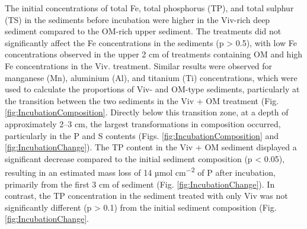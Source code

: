 \documentclass[12pt,twoside]{book}
\begin{document}
The initial concentrations of total Fe, total phosphorus (TP), and total sulphur (TS) in the sediments before incubation were higher in the Viv-rich deep sediment compared to the OM-rich upper sediment. The treatments did not significantly affect the Fe concentrations in the sediments (p \textgreater{} 0.5), with low Fe concentrations observed in the upper 2 cm of treatments containing OM and high Fe concentrations in the Viv. treatment. Similar results were observed for manganese (Mn), aluminium (Al), and titanium (Ti) concentrations, which were used to calculate the proportions of Viv- and OM-type sediments, particularly at the transition between the two sediments in the Viv + OM treatment (Fig. \ref{fig:IncubationComposition}. Directly below this transition zone, at a depth of approximately 2--3 cm, the largest transformations in composition occurred, particularly in the P and S contents (Figs. \ref{fig:IncubationComposition} and \ref{fig:IncubationChange}). The TP content in the Viv + OM sediment displayed a significant decrease compared to the initial sediment composition (p \textless{} 0.05), resulting in an estimated mass loss of 14 µmol cm\textsuperscript{−2} of P after incubation, primarily from the first 3 cm of sediment (Fig. \ref{fig:IncubationChange}). In contrast, the TP concentration in the sediment treated with only Viv was not significantly different (p \textgreater{} 0.1) from the initial sediment composition (Fig. \ref{fig:IncubationChange}.
\end{document}
